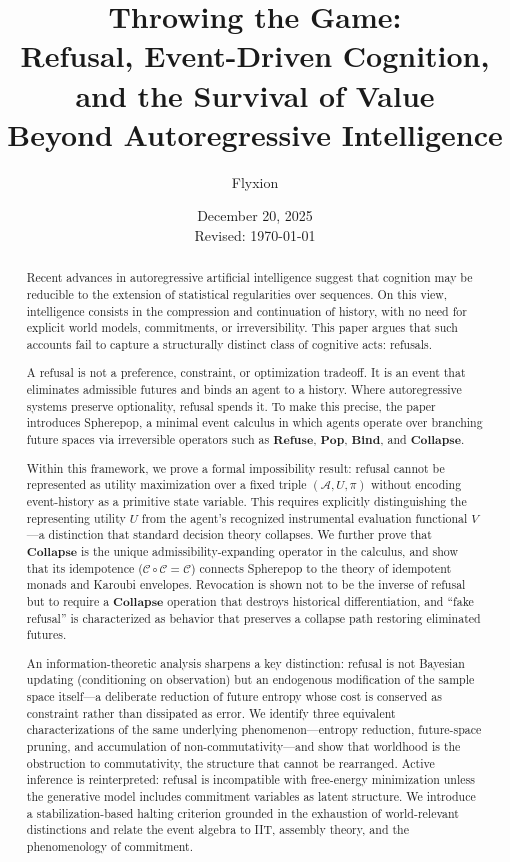 \documentclass[11pt]{article}
\title{Throwing the Game:\\
Refusal, Event-Driven Cognition, and the Survival of Value\\
Beyond Autoregressive Intelligence}
\author{Flyxion}
\date{December 20, 2025\\Revised: \today}
\newcommand{\Act}{\mathcal{A}}
\begin{document}
\maketitle

\begin{abstract}
Recent advances in autoregressive artificial intelligence suggest that cognition
may be reducible to the extension of statistical regularities over sequences.
On this view, intelligence consists in the compression and continuation of
history, with no need for explicit world models, commitments, or irreversibility.
This paper argues that such accounts fail to capture a structurally distinct
class of cognitive acts: refusals.

A refusal is not a preference, constraint, or optimization tradeoff. It is an
event that eliminates admissible futures and binds an agent to a history.
Where autoregressive systems preserve optionality, refusal spends it. To make
this precise, the paper introduces Spherepop, a minimal event calculus in which
agents operate over branching future spaces via irreversible operators such as
$\mathbf{Refuse}$, $\mathbf{Pop}$, $\mathbf{Bind}$, and $\mathbf{Collapse}$.

Within this framework, we prove a formal impossibility result: refusal cannot be
represented as utility maximization over a fixed triple $(\Act, U, \pi)$ without
encoding event-history as a primitive state variable. This requires explicitly
distinguishing the representing utility $U$ from the agent's recognized
instrumental evaluation functional $V$---a distinction that standard decision
theory collapses. We further prove that $\mathbf{Collapse}$ is the unique
admissibility-expanding operator in the calculus, and show that its idempotence
($\mathcal{C} \circ \mathcal{C} = \mathcal{C}$) connects Spherepop to the
theory of idempotent monads and Karoubi envelopes. Revocation is shown not to
be the inverse of refusal but to require a $\mathbf{Collapse}$ operation that
destroys historical differentiation, and ``fake refusal'' is characterized as
behavior that preserves a collapse path restoring eliminated futures.

An information-theoretic analysis sharpens a key distinction: refusal is not
Bayesian updating (conditioning on observation) but an endogenous modification
of the sample space itself---a deliberate reduction of future entropy whose cost
is conserved as constraint rather than dissipated as error. We identify three
equivalent characterizations of the same underlying phenomenon---entropy
reduction, future-space pruning, and accumulation of non-commutativity---and
show that worldhood is the obstruction to commutativity, the structure that
cannot be rearranged. Active inference is reinterpreted: refusal is incompatible
with free-energy minimization unless the generative model includes commitment
variables as latent structure. We introduce a stabilization-based halting
criterion grounded in the exhaustion of world-relevant distinctions and relate
the event algebra to IIT, assembly theory, and the phenomenology of commitment.


\end{abstract}
\end{document}
